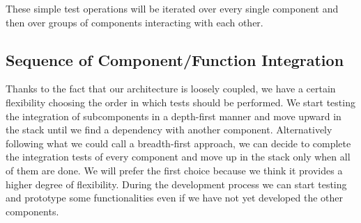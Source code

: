 These simple test operations will be iterated over every single component and then
over groups of components interacting with each other.

\subsection{Sequence of Component/Function Integration}
Thanks to the fact that our architecture is loosely coupled, we have a certain flexibility
choosing the order in which tests should be performed.
We start testing the integration of subcomponents in a depth-first manner and
move upward in the stack until we find a dependency with another component.
Alternatively following what we could call a breadth-first approach,
we can decide to complete the integration tests of every component and
move up in the stack only when all of them are done.
We will prefer the first choice because we think it provides a higher degree of
flexibility. During the development process we can start testing and prototype
some functionalities even if we have not yet developed the other components.
